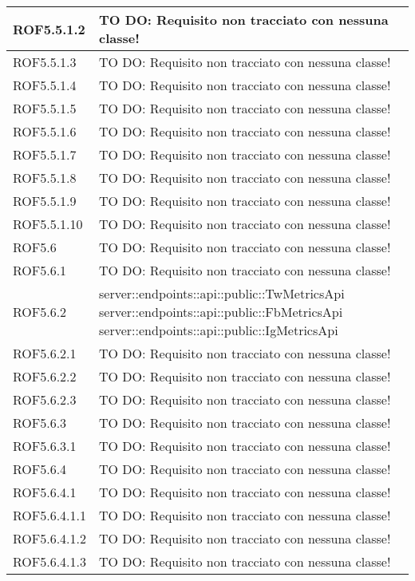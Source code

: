 \begin{center}
\begin{longtable}{| p{2.5cm} | p{11cm} |}
\hline
ROF5.5.1.2 & TO DO: Requisito non tracciato con nessuna classe! \\
\hline
ROF5.5.1.3 & TO DO: Requisito non tracciato con nessuna classe! \\
\hline
ROF5.5.1.4 & TO DO: Requisito non tracciato con nessuna classe! \\
\hline
ROF5.5.1.5 & TO DO: Requisito non tracciato con nessuna classe! \\
\hline
ROF5.5.1.6 & TO DO: Requisito non tracciato con nessuna classe! \\
\hline
ROF5.5.1.7 & TO DO: Requisito non tracciato con nessuna classe! \\
\hline
ROF5.5.1.8 & TO DO: Requisito non tracciato con nessuna classe! \\
\hline
ROF5.5.1.9 & TO DO: Requisito non tracciato con nessuna classe! \\
\hline
ROF5.5.1.10 & TO DO: Requisito non tracciato con nessuna classe! \\
\hline
ROF5.6 & TO DO: Requisito non tracciato con nessuna classe! \\
\hline
ROF5.6.1 & TO DO: Requisito non tracciato con nessuna classe! \\
\hline
ROF5.6.2 & server::endpoints::api::public::TwMetricsApi \newline server::endpoints::api::public::FbMetricsApi \newline server::endpoints::api::public::IgMetricsApi \\
\hline
ROF5.6.2.1 & TO DO: Requisito non tracciato con nessuna classe! \\
\hline
ROF5.6.2.2 & TO DO: Requisito non tracciato con nessuna classe! \\
\hline
ROF5.6.2.3 & TO DO: Requisito non tracciato con nessuna classe! \\
\hline
ROF5.6.3 & TO DO: Requisito non tracciato con nessuna classe! \\
\hline
ROF5.6.3.1 & TO DO: Requisito non tracciato con nessuna classe! \\
\hline
ROF5.6.4 & TO DO: Requisito non tracciato con nessuna classe! \\
\hline
ROF5.6.4.1 & TO DO: Requisito non tracciato con nessuna classe! \\
\hline
ROF5.6.4.1.1 & TO DO: Requisito non tracciato con nessuna classe! \\
\hline
ROF5.6.4.1.2 & TO DO: Requisito non tracciato con nessuna classe! \\
\hline
ROF5.6.4.1.3 & TO DO: Requisito non tracciato con nessuna classe! \\

\end{longtable}
\end{center}
